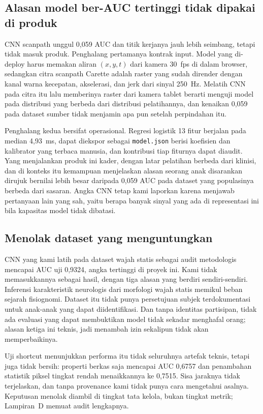 \documentclass{article}
\begin{document}
\subsection{Alasan model ber-AUC tertinggi tidak dipakai di produk}
\label{sec:trade-off}

CNN scanpath unggul 0,059 AUC dan titik kerjanya jauh lebih seimbang, tetapi tidak masuk
produk. Penghalang pertamanya kontrak input. Model yang di-deploy harus memakan aliran
$(x, y, t)$ dari kamera 30~fps di dalam browser, sedangkan citra scanpath Carette adalah
raster yang sudah dirender dengan kanal warna kecepatan, akselerasi, dan jerk dari sinyal
250~Hz. Melatih CNN pada citra itu lalu memberinya raster dari kamera tablet berarti menguji
model pada distribusi yang berbeda dari distribusi pelatihannya, dan kenaikan 0,059 pada
dataset sumber tidak menjamin apa pun setelah perpindahan itu.

Penghalang kedua bersifat operasional. Regresi logistik 13 fitur berjalan pada median
4,93~ms, dapat diekspor sebagai \texttt{model.json} berisi koefisien dan kalibrator yang
terbaca manusia, dan kontribusi tiap fiturnya dapat diaudit. Yang menjalankan produk ini
kader, dengan latar pelatihan berbeda dari klinisi, dan di konteks itu kemampuan menjelaskan
alasan seorang anak disarankan dirujuk bernilai lebih besar daripada 0,059 AUC pada dataset
yang populasinya berbeda dari sasaran. Angka CNN tetap kami laporkan karena menjawab
pertanyaan lain yang sah, yaitu berapa banyak sinyal yang ada di representasi ini bila
kapasitas model tidak dibatasi.

\subsection{Menolak dataset yang menguntungkan}
\label{sec:tolak-wajah}

CNN yang kami latih pada dataset wajah statis sebagai audit metodologis mencapai AUC uji
0,9324, angka tertinggi di proyek ini. Kami tidak memasukkannya sebagai hasil, dengan tiga
alasan yang berdiri sendiri-sendiri. Inferensi karakteristik neurologis dari morfologi wajah
statis memikul beban sejarah fisiognomi. Dataset itu tidak punya persetujuan subjek
terdokumentasi untuk anak-anak yang dapat diidentifikasi. Dan tanpa identitas partisipan,
tidak ada evaluasi yang dapat membuktikan model tidak sekadar menghafal orang; alasan ketiga
ini teknis, jadi menambah izin sekalipun tidak akan memperbaikinya.

Uji shortcut menunjukkan performa itu tidak seluruhnya artefak teknis, tetapi juga tidak
bersih: properti berkas saja mencapai AUC 0,6757 dan penambahan statistik piksel tingkat
rendah menaikkannya ke 0,7515. Sisa jaraknya tidak terjelaskan, dan tanpa provenance kami
tidak punya cara mengetahui asalnya. Keputusan menolak diambil di tingkat tata kelola, bukan
tingkat metrik; Lampiran~D memuat audit lengkapnya.
\end{document}
